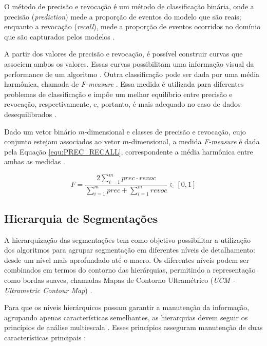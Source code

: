 \begin{document}
O método de precisão e revocação é um método de classificação binária, onde a precisão (\textit{prediction}) mede a proporção de eventos do modelo que são reais; enquanto a revocação (\textit{recall}), mede a proporção de eventos ocorridos no domínio que são capturados pelos modelos \cite{PREC_RECALL_REGR}. 

A partir dos valores de precisão e revocação, é possível construir curvas que associem ambos os valores. Essas curvas possibilitam uma informação visual da performance de um algoritmo \cite{PRECISION_RECALL}. Outra classificação pode ser dada por uma média harmônica, chamada de \textit{F-measure} \cite{F_MEASURE}. Essa medida é utilizada para diferentes problemas de classificação e impõe um melhor equilíbrio entre precisão e revocação, respectivamente, e, portanto, é mais adequado no caso de dados desequilibrados \cite{F_MEASURE}. 

Dado um vetor binário $m$-dimensional e classes de precisão e revocação, cujo conjunto estejam associados ao vetor $m$-dimensional, a medida \textit{F-measure} é dada pela Equação \ref{equ:PREC_RECALL}, correspondente a média harmônica entre ambas as medidas \cite{F_MEASURE}.

\begin{equation}
 F=\frac{ 2 \sum\limits_{i=1}^m {prec \cdot revoc}}{ \sum\limits_{i=1}^m {prec} + \sum\limits_{i=1}^m {revoc}}  \in [0,1]
 \label{equ:PREC_RECALL}
\end{equation}


\subsection{Hierarquia de Segmentações} \label{ssec:hierarq_segmentacao}

A hierarquização das segmentações tem como objetivo possibilitar a utilização dos algoritmos para agrupar segmentação em diferentes níveis de detalhamento: desde um nível mais aprofundado até o macro. Os diferentes níveis podem ser combinados em termos do contorno das hierárquias, permitindo a representação como bordas suaves, chamadas Mapas de Contorno Ultramétrico (\textit{UCM - Ultrametric Contour Map}) \cite{ULTRAMETRIC}.

Para que os níveis hierárquicos possam garantir a manutenção da informação, agrupando apenas características semelhantes, as hierarquias devem seguir os princípios de análise multiescala \cite{SILVIO_ZENILTON}. Esses princípios asseguram manutenção de duas características principais \cite{SILVIO_ZENILTON}:
\end{document}
